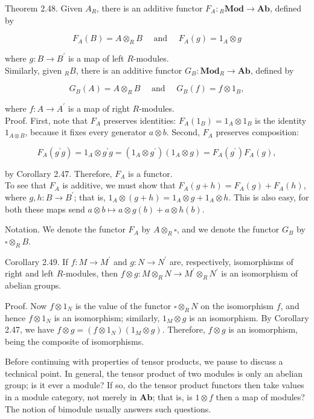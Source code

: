 \documentclass[10pt]{article}
\begin{document}
Theorem 2.48. Given $A_{R}$, there is an additive functor $F_{A}:{ }_{R} \mathbf{M o d} \rightarrow \mathbf{A b}$, defined by

$$
F_{A}(B)=A \otimes_{R} B \quad \text { and } \quad F_{A}(g)=1_{A} \otimes g
$$

where $g: B \rightarrow B^{\prime}$ is a map of left $R$-modules.\\
Similarly, given ${ }_{R} B$, there is an additive functor $G_{B}: \mathbf{M o d}_{R} \rightarrow \mathbf{A b}$, defined by

$$
G_{B}(A)=A \otimes_{R} B \quad \text { and } \quad G_{B}(f)=f \otimes 1_{B},
$$

where $f: A \rightarrow A^{\prime}$ is a map of right $R$-modules.\\
Proof. First, note that $F_{A}$ preserves identities: $F_{A}\left(1_{B}\right)=1_{A} \otimes 1_{B}$ is the identity $1_{A \otimes B}$, because it fixes every generator $a \otimes b$. Second, $F_{A}$ preserves composition:

$$
F_{A}\left(g^{\prime} g\right)=1_{A} \otimes g^{\prime} g=\left(1_{A} \otimes g^{\prime}\right)\left(1_{A} \otimes g\right)=F_{A}\left(g^{\prime}\right) F_{A}(g),
$$

by Corollary 2.47. Therefore, $F_{A}$ is a functor.\\
To see that $F_{A}$ is additive, we must show that $F_{A}(g+h)=F_{A}(g)+F_{A}(h)$, where $g, h: B \rightarrow B^{\prime}$; that is, $1_{A} \otimes(g+h)=1_{A} \otimes g+1_{A} \otimes h$. This is also easy, for both these maps send $a \otimes b \mapsto a \otimes g(b)+a \otimes h(b)$.

Notation. We denote the functor $F_{A}$ by $A \otimes_{R} \square$, and we denote the functor $G_{B}$ by $\square \otimes_{R} B$.

Corollary 2.49. If $f: M \rightarrow M^{\prime}$ and $g: N \rightarrow N^{\prime}$ are, respectively, isomorphisms of right and left $R$-modules, then $f \otimes g: M \otimes_{R} N \rightarrow M^{\prime} \otimes_{R} N^{\prime}$ is an isomorphism of abelian groups.

Proof. Now $f \otimes 1_{N}$ is the value of the functor $\square \otimes_{R} N$ on the isomorphism $f$, and hence $f \otimes 1_{N}$ is an isomorphism; similarly, $1_{M} \otimes g$ is an isomorphism. By Corollary 2.47, we have $f \otimes g=\left(f \otimes 1_{N}\right)\left(1_{M} \otimes g\right)$. Therefore, $f \otimes g$ is an isomorphism, being the composite of isomorphisms.

Before continuing with properties of tensor products, we pause to discuss a technical point. In general, the tensor product of two modules is only an abelian group; is it ever a module? If so, do the tensor product functors then take values in a module category, not merely in $\mathbf{A b}$; that is, is $1 \otimes f$ then a map of modules? The notion of bimodule usually answers such questions.
\end{document}
